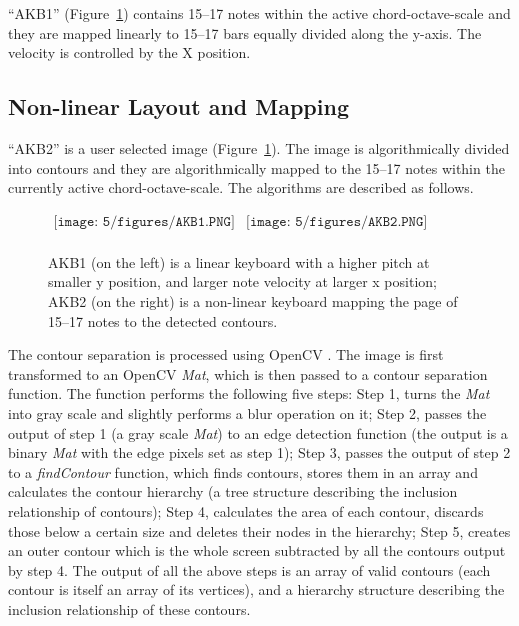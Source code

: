 ``AKB1'' (Figure~\ref{fig:5-AKB12}) contains 15--17 notes within the active chord-octave-scale and they are mapped linearly to 15--17
bars equally divided along the y-axis. The velocity is controlled by the X position.

\subsection{Non-linear Layout and Mapping}
``AKB2'' is a user selected image (Figure~\ref{fig:5-AKB12}). The image is algorithmically divided into contours and they are algorithmically mapped to the 15--17 notes within the currently active chord-octave-scale. The algorithms are described as follows.
\begin{figure}[htbp]
\begin{center}$
\begin{array}{cc}
\texttt{[image: 5/figures/AKB1.PNG]} &
\texttt{[image: 5/figures/AKB2.PNG]} \\
\end{array}$
\end{center}
\caption{AKB1 (on the left) is a linear keyboard with a higher pitch at smaller y position, and larger note velocity at larger x position; AKB2 (on the right) is a non-linear keyboard mapping the page of 15--17 notes to the detected contours.}
\label{fig:5-AKB12}
\end{figure}

The contour separation is processed using OpenCV \cite{opencv}. The image is first transformed to an OpenCV \textit{Mat}, which is then passed to a contour separation function. The function performs the following five steps: Step 1, turns the \textit{Mat} into gray scale and slightly performs a blur operation on it; Step 2, passes the output of step 1 (a gray scale \textit{Mat}) to an edge detection function (the output is a binary \textit{Mat} with the edge pixels set as step 1); Step 3, passes the output of step 2 to a \textit{findContour} function, which finds contours, stores them in an array and calculates the contour hierarchy (a tree structure describing the inclusion relationship of contours); Step 4, calculates the area of each contour, discards those below a certain size and deletes their nodes in the hierarchy; Step 5, creates an outer contour which is the whole screen subtracted by all the contours output by step 4. The output of all the above steps is an array of valid contours (each contour is itself an array of its vertices), and a hierarchy structure describing the inclusion relationship of these contours.

